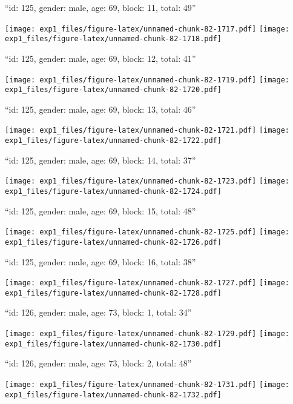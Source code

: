 \documentclass[11pt,,]{article}
\begin{document}
\newpage
[1] 

``id: 125, gender: male, age: 69, block: 11, total: 49''

\texttt{[image: exp1\_files/figure-latex/unnamed-chunk-82-1717.pdf]}
\texttt{[image: exp1\_files/figure-latex/unnamed-chunk-82-1718.pdf]}

\newpage
[1] 

``id: 125, gender: male, age: 69, block: 12, total: 41''

\texttt{[image: exp1\_files/figure-latex/unnamed-chunk-82-1719.pdf]}
\texttt{[image: exp1\_files/figure-latex/unnamed-chunk-82-1720.pdf]}

\newpage
[1] 

``id: 125, gender: male, age: 69, block: 13, total: 46''

\texttt{[image: exp1\_files/figure-latex/unnamed-chunk-82-1721.pdf]}
\texttt{[image: exp1\_files/figure-latex/unnamed-chunk-82-1722.pdf]}

\newpage
[1] 

``id: 125, gender: male, age: 69, block: 14, total: 37''

\texttt{[image: exp1\_files/figure-latex/unnamed-chunk-82-1723.pdf]}
\texttt{[image: exp1\_files/figure-latex/unnamed-chunk-82-1724.pdf]}

\newpage
[1] 

``id: 125, gender: male, age: 69, block: 15, total: 48''

\texttt{[image: exp1\_files/figure-latex/unnamed-chunk-82-1725.pdf]}
\texttt{[image: exp1\_files/figure-latex/unnamed-chunk-82-1726.pdf]}

\newpage
[1] 

``id: 125, gender: male, age: 69, block: 16, total: 38''

\texttt{[image: exp1\_files/figure-latex/unnamed-chunk-82-1727.pdf]}
\texttt{[image: exp1\_files/figure-latex/unnamed-chunk-82-1728.pdf]}

\newpage
[1] 

``id: 126, gender: male, age: 73, block: 1, total: 34''

\texttt{[image: exp1\_files/figure-latex/unnamed-chunk-82-1729.pdf]}
\texttt{[image: exp1\_files/figure-latex/unnamed-chunk-82-1730.pdf]}

\newpage
[1] 

``id: 126, gender: male, age: 73, block: 2, total: 48''

\texttt{[image: exp1\_files/figure-latex/unnamed-chunk-82-1731.pdf]}
\texttt{[image: exp1\_files/figure-latex/unnamed-chunk-82-1732.pdf]}
\end{document}
